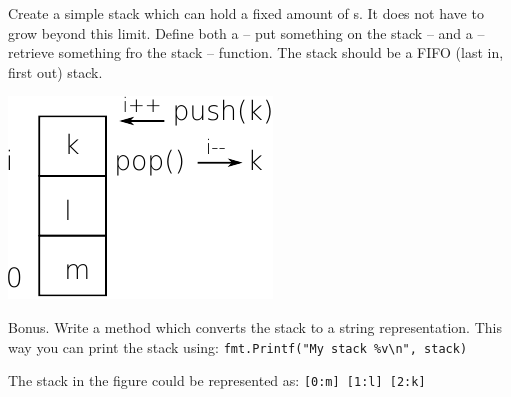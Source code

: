 \begin{Exercise}[title={Stack},difficulty=5]
\label{ex:stack}
\Question \label{ex:stack q1} Create a simple stack which can hold a
fixed amount of s. It does not have to grow beyond this limit.
Define both a  -- put something on the stack -- and a  
-- retrieve something fro the stack -- function. The stack should be
a FIFO (last in, first out) stack.

\begin{center}
\includegraphics[scale=0.90]{fig/stack.pdf}
\label{fig:stack}
\end{center}

\Question \label{ex:stack q2} Bonus. Write a  method which 
converts the stack to a string representation.  This way you can print the stack using:
\lstinline{fmt.Printf("My stack %v\n", stack)}

\noindent{}The stack in the figure could be represented as:
\texttt{[0:m] [1:l] [2:k]}

\end{Exercise}

